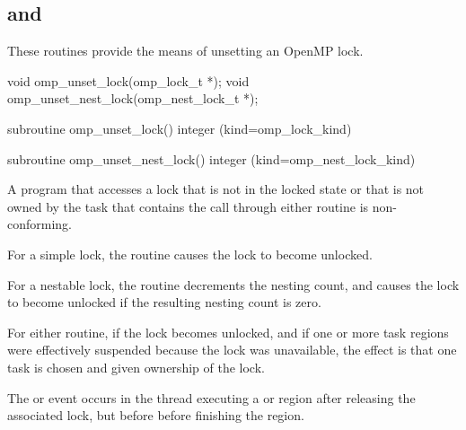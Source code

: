 \subsection{ and }
\label{subsec:omp_unset_lock and omp_unset_nest_lock}
\summary
These routines provide the means of unsetting an OpenMP lock.

\format
\ccppspecificstart
\begin{boxedcode}
void omp\_unset\_lock(omp\_lock\_t *);
void omp\_unset\_nest\_lock(omp\_nest\_lock\_t *);
\end{boxedcode}
\ccppspecificend

\fortranspecificstart
\begin{boxedcode}
subroutine omp\_unset\_lock()
integer (kind=omp\_lock\_kind) 

subroutine omp\_unset\_nest\_lock()
integer (kind=omp\_nest\_lock\_kind) 
\end{boxedcode}
\fortranspecificend

\constraints
A program that accesses a lock that is not in the locked state or that is 
not owned by the task that contains the call through either routine is 
non-conforming.


\effect
For a simple lock, the  routine causes the lock to become unlocked.

For a nestable lock, the  routine decrements the nesting 
count, and causes the lock to become unlocked if the resulting nesting count is zero.

For either routine, if the lock becomes unlocked, and if one or more task 
regions were effectively suspended because the lock was unavailable, the 
effect is that one task is chosen and given ownership of the lock. 

\events

The  or  event occurs in the thread 
executing a  or  region
after releasing the associated lock, but before before finishing the region.

